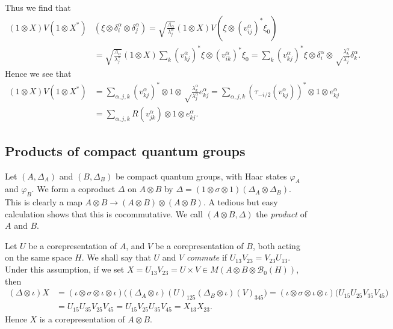 \documentclass[twoside,a4paper,12pt]{article}
\theoremstyle{plain}
\theoremstyle{definition}
\newcommand{\mc}{\mathcal}
\begin{document}
Thus we find that
\begin{align*}
(1\otimes X)V(1\otimes X^*) & (\xi\otimes\delta^\alpha_i\otimes\delta^\alpha_j)
= \sqrt{\frac{\Lambda_\alpha}{\lambda^\alpha_j}} (1\otimes X)V(\xi
   \otimes (v^\alpha_{ij})^*\xi_0) \\
&= \sqrt{\frac{\Lambda_\alpha}{\lambda^\alpha_j}} (1\otimes X) \sum_k
   (v^\alpha_{kj})^*\xi \otimes (v^\alpha_{ik})^*\xi_0
= \sum_k (v^\alpha_{kj})^*\xi \otimes \delta^\alpha_i \otimes
   \sqrt\frac{\lambda^\alpha_k}{\lambda^\alpha_j} \delta^\alpha_k.
\end{align*}
Hence we see that
\begin{align*} (1\otimes X)V(1\otimes X^*)
&= \sum_{\alpha,j,k} (v^\alpha_{kj})^* \otimes 1 \otimes 
\sqrt\frac{\lambda^\alpha_k}{\lambda^\alpha_j} e_{kj}^\alpha
= \sum_{\alpha,j,k} (\tau_{-i/2}(v^\alpha_{kj}))^* \otimes 1
   \otimes e_{kj}^\alpha \\
&= \sum_{\alpha,j,k} R(v^\alpha_{jk}) \otimes 1 \otimes e_{kj}^\alpha.
\end{align*}


\subsection{Products of compact quantum groups}

Let $(A,\Delta_A)$ and $(B,\Delta_B)$ be compact quantum groups, with Haar
states $\varphi_A$ and $\varphi_B$.  We form a coproduct $\Delta$ on
$A\otimes B$ by $\Delta = (1\otimes\sigma\otimes 1)(\Delta_A\otimes\Delta_B)$.
This is clearly a map $A\otimes B \rightarrow (A\otimes B)\otimes(A\otimes B)$.
A tedious but easy calculation shows that this is cocommutative.  We call
$(A\otimes B,\Delta)$ the \emph{product} of $A$ and $B$.

Let $U$ be a corepresentation of $A$, and $V$ be a corepresentation of $B$,
both acting on the same space $H$.  We shall say that $U$ and $V$
\emph{commute} if $U_{13} V_{23} = V_{23} U_{13}$.  Under this assumption, if
we set $X=U_{13} V_{23} = U \times V \in M(A\otimes B\otimes \mc B_0(H))$, then
\begin{align*} (\Delta\otimes\iota)X
&= (\iota\otimes\sigma\otimes\iota\otimes\iota)
\big( (\Delta_A\otimes\iota)(U)_{125} (\Delta_B\otimes\iota)(V)_{345} \big)
= (\iota\otimes\sigma\otimes\iota\otimes\iota)
   \big( U_{15} U_{25} V_{35} V_{45} \big) \\
&= U_{15} U_{35} V_{25} V_{45}
= U_{15} V_{25} U_{35} V_{45}
= X_{13} X_{23}. \end{align*}
Hence $X$ is a corepresentation of $A\otimes B$.
\end{document}
